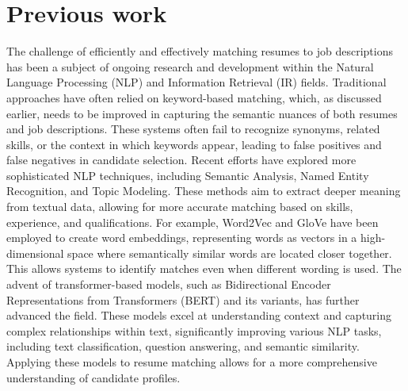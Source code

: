 \documentclass[12pt]{report}
\begin{document}
\section{Previous work}

The challenge of efficiently and effectively matching resumes to job descriptions has been a subject of ongoing research and development within the Natural Language Processing (NLP) and Information Retrieval (IR) fields. \cite{rojas-galeano-2022} Traditional approaches have often relied on keyword-based matching, which, as discussed earlier, needs to be improved in capturing the semantic nuances of both resumes and job descriptions. These systems often fail to recognize synonyms, related skills, or the context in which keywords appear, leading to false positives and false negatives in candidate selection.\cite{gawande-2024}
Recent efforts have explored more sophisticated NLP techniques, including Semantic Analysis, Named Entity Recognition, and Topic Modeling. These methods aim to extract deeper meaning from textual data, allowing for more accurate matching based on skills, experience, and qualifications. For example, Word2Vec and GloVe have been employed to create word embeddings, representing words as vectors in a high-dimensional space where semantically similar words are located closer together. This allows systems to identify matches even when different wording is used. \cite{alderham-2024}
The advent of transformer-based models, such as Bidirectional Encoder Representations from Transformers (BERT) and its variants, has further advanced the field. These models excel at understanding context and capturing complex relationships within text, significantly improving various NLP tasks, including text classification, question answering, and semantic similarity. Applying these models to resume matching allows for a more comprehensive understanding of candidate profiles. \cite{shan-2024}
\end{document}
